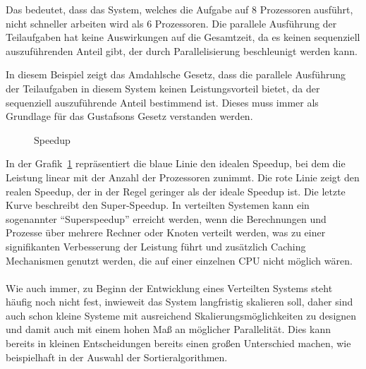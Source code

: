 \documentclass[../vs-script-first-v01.tex]{subfiles}
\begin{document}
\begin{itemize}
Das bedeutet, dass das System, welches die Aufgabe auf 8 Prozessoren ausführt, nicht schneller arbeiten wird als 6 Prozessoren. Die parallele Ausführung der Teilaufgaben hat keine Auswirkungen auf die Gesamtzeit, da es keinen sequenziell auszuführenden Anteil gibt, der durch Parallelisierung beschleunigt werden kann.

In diesem Beispiel zeigt das Amdahlsche Gesetz, dass die parallele Ausführung der Teilaufgaben in diesem System keinen Leistungsvorteil bietet, da der sequenziell auszuführende Anteil bestimmend ist. Dieses muss immer als Grundlage für das Gustafsons Gesetz verstanden werden.

\begin{figure}[!h]
\centering
{}
\caption{Speedup}
\label{fig:speedup}
\end{figure}

In der Grafik~\ref{fig:speedup} repräsentiert die blaue Linie den idealen Speedup, bei dem die Leistung linear mit der Anzahl der Prozessoren zunimmt. Die rote Linie zeigt den realen Speedup, der in der Regel geringer als der ideale Speedup ist. Die letzte Kurve beschreibt den Super-Speedup.
In verteilten Systemen kann ein sogenannter \enquote{Superspeedup} erreicht werden, wenn die Berechnungen und Prozesse über mehrere Rechner oder Knoten verteilt werden, was zu einer signifikanten Verbesserung der Leistung führt und zusätzlich Caching Mechanismen genutzt werden, die auf einer einzelnen CPU nicht möglich wären.\\
\\
Wie auch immer, zu Beginn der Entwicklung eines Verteilten Systems steht häufig noch nicht fest, inwieweit das System langfristig skalieren soll, daher sind auch schon kleine Systeme mit ausreichend Skalierungsmöglichkeiten zu designen und damit auch mit einem hohen Maß an möglicher Parallelität. Dies kann bereits in kleinen Entscheidungen bereits einen großen Unterschied machen, wie beispielhaft in der Auswahl der Sortieralgorithmen.


\end{itemize}
\end{document}
